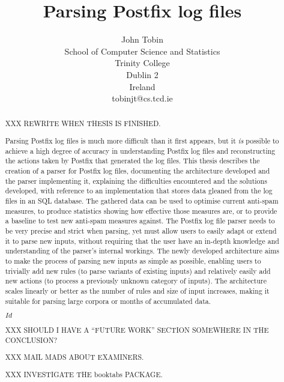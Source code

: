 \documentclass[a4paper,12pt,draft]{report}
\begin{document}
\title{Parsing Postfix log files}
\author{John Tobin \\ School of Computer Science and Statistics \\
Trinity College \\ Dublin 2 \\ Ireland \\ tobinjt@cs.tcd.ie}
\maketitle

\begin{abstract}

    \setcounter{page}{2}

    XXX REWRITE WHEN THESIS IS FINISHED\@.

    Parsing Postfix log files is much more difficult than it first appears,
    but it \textit{is\/} possible to achieve a high degree of accuracy in
    understanding Postfix log files and reconstructing the actions taken by
    Postfix that generated the log files.  This thesis describes the
    creation of a parser for Postfix log files, documenting the
    architecture developed and the parser implementing it, explaining the
    difficulties encountered and the solutions developed, with reference to
    an implementation that stores data gleaned from the log files in an SQL
    database.  The gathered data can be used to optimise current anti-spam
    measures, to produce statistics showing how effective those measures
    are, or to provide a baseline to test new anti-spam measures against.
    The Postfix log file parser needs to be very precise and strict when
    parsing, yet must allow users to easily adapt or extend it to parse new
    inputs, without requiring that the user have an in-depth knowledge and
    understanding of the parser's internal workings.  The newly developed
    architecture aims to make the process of parsing new inputs as simple
    as possible, enabling users to trivially add new rules (to parse
    variants of existing inputs) and relatively easily add new actions (to
    process a previously unknown category of inputs).  The architecture
    scales linearly or better as the number of rules and size of input
    increases, making it suitable for parsing large corpora or months of
    accumulated data.

    \SVN$Id$
    \begin{center}
        \SVNId{}
    \end{center}

    XXX SHOULD I HAVE A ``FUTURE WORK'' SECTION SOMEWHERE IN THE
    CONCLUSION\@?

    XXX MAIL MADS ABOUT EXAMINERS\@.

    XXX INVESTIGATE THE booktabs PACKAGE\@.

\end{abstract}
\end{document}

